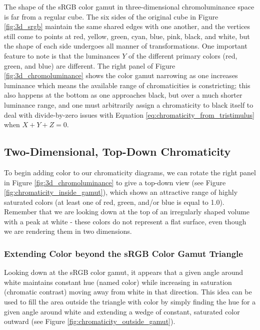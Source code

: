 \documentclass{article}
\begin{document}
\begin{multicols}{2}
The shape of the sRGB color gamut in three-dimensional chromoluminance space is far from a regular cube.  The six sides of the original cube in Figure \ref{fig:3d_srgb} maintain the same shared edges with one another, and the vertices still come to points at red, yellow, green, cyan, blue, pink, black, and white, but the shape of each side undergoes all manner of transformations.  One important feature to note is that the luminances $Y$ of the different primary colors (red, green, and blue) are different.  The right panel of Figure \ref{fig:3d_chromoluminance} shows the color gamut narrowing as one increases luminance which means the available range of chromaticities is constricting; this also happens at the bottom as one approaches black, but over a much shorter luminance range, and one must arbitrarily assign a chromaticity to black itself to deal with divide-by-zero issues with Equation \ref{eq:chromaticity_from_tristimulus} when $X+Y+Z=0$.

\subsection{Two-Dimensional, Top-Down Chromaticity} %

To begin adding color to our chromaticity diagrams, we can rotate the right panel in Figure \ref{fig:3d_chromoluminance} to give a top-down view (see Figure \ref{fig:chromaticity_inside_gamut}), which shows an attractive range of highly saturated colors (at least one of red, green, and/or blue is equal to 1.0).  Remember that we are looking down at the top of an irregularly shaped volume with a peak at white - these colors do not represent a flat surface, even though we are rendering them in two dimensions.

\subsubsection{Extending Color beyond the sRGB Color Gamut Triangle} %

Looking down at the sRGB color gamut, it appears that a given angle around white maintains constant hue (named color) while increasing in saturation (chromatic contrast) moving away from white in that direction.  This idea can be used to fill the area outside the triangle with color by simply finding the hue for a given angle around white and extending a wedge of constant, saturated color outward (see Figure \ref{fig:chromaticity_outside_gamut}).


\end{multicols}
\end{document}

